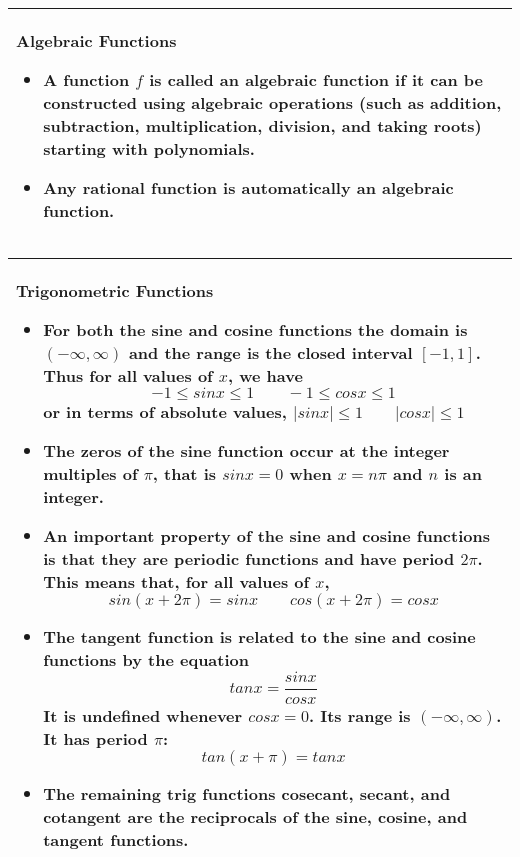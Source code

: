 \documentclass[fleqn]{article}
\begin{document}
\begin{center}
\def\arraystretch{1.3}
{\setlength{\tabcolsep}{16pt}
\begin{tabularx}{.9\textwidth}{|X|}
\hline
	\vspace{1pt}
	\textbf{Algebraic Functions}
	\begin{itemize}
	\item A function $f$ is called an \textbf{algebraic function} if it can be constructed using algebraic operations (such as addition, subtraction, multiplication, division, and taking roots) starting with polynomials.
	\item Any rational function is automatically an algebraic function.
	\end{itemize} \\
\hline
\end{tabularx}}
\vspace{12pt}	

\def\arraystretch{1.3}
{\setlength{\tabcolsep}{16pt}
\begin{tabularx}{.9\textwidth}{|X|}
\hline
	\vspace{1pt}
	\textbf{Trigonometric Functions}
	\begin{itemize}
	\item For both the sine and cosine functions the domain is $(-\infty, \infty)$ and the range is the closed interval $[-1, 1]$. Thus for all values of $x$, we have
	$$-1 \le sinx \le 1 \hspace{24pt} -1 \le cosx \le 1$$
	or in terms of absolute values, \hspace{12pt} $|sinx| \le 1 \hspace{24pt} |cosx| \le 1$
	\item The zeros of the sine function occur at the integer multiples of $\pi$, that is $sinx = 0$ when $x=n\pi$ and $n$ is an integer.
	\item An important property of the sine and cosine functions is that they are periodic functions and have period $2\pi$. This means that, for all values of $x$,
	$$sin(x+2\pi) = sinx \hspace{24pt} cos(x+2\pi) = cosx$$
	\item The tangent function is related to the sine and cosine functions by the equation
	$$tanx = \dfrac{sinx}{cosx}$$
	It is undefined whenever $cosx = 0$. Its range is $(-\infty, \infty)$. It has period $\pi$:
	$$tan(x+\pi) = tanx$$
	\item The remaining trig functions cosecant, secant, and cotangent are the reciprocals of the sine, cosine, and tangent functions.
	\end{itemize} \\
\hline
\end{tabularx}}
\vspace{12pt}	


\end{center}
\end{document}
